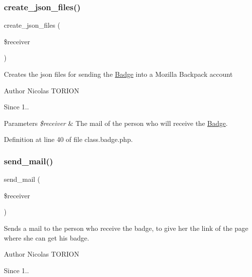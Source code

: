 \subsubsection{\texorpdfstring{create\+\_\+json\+\_\+files()}{create\_json\_files()}}
{\footnotesize\ttfamily create\+\_\+json\+\_\+files (\begin{DoxyParamCaption}\item[{}]{\$receiver }\end{DoxyParamCaption})}

Creates the json files for sending the \hyperlink{class_badge}{Badge} into a Mozilla Backpack account

\begin{DoxyAuthor}{Author}
Nicolas T\+O\+R\+I\+ON 
\end{DoxyAuthor}
\begin{DoxySince}{Since}
1.. 
\end{DoxySince}

\begin{DoxyParams}{Parameters}
{\em \$receiver} & The mail of the person who will receive the \hyperlink{class_badge}{Badge}. \\
\hline
\end{DoxyParams}


Definition at line 40 of file class.\+badge.\+php.

\mbox{\label{class_badge_a64c3041fe3d488c19cc5461a0af0c353}} 
\subsubsection{\texorpdfstring{send\+\_\+mail()}{send\_mail()}}
{\footnotesize\ttfamily send\+\_\+mail (\begin{DoxyParamCaption}\item[{}]{\$receiver }\end{DoxyParamCaption})}

Sends a mail to the person who receive the badge, to give her the link of the page where she can get his badge.

\begin{DoxyAuthor}{Author}
Nicolas T\+O\+R\+I\+ON 
\end{DoxyAuthor}
\begin{DoxySince}{Since}
1.. 
\end{DoxySince}

